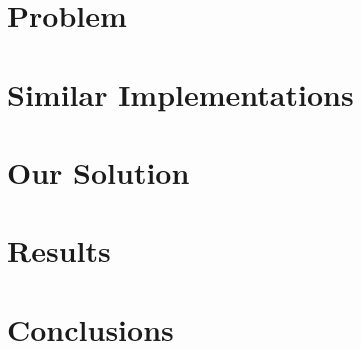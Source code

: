\documentclass[sigconf,12pt,review=false,natbib=false]{acmart}
\begin{document}
\section{Problem}

\section{Similar Implementations}

\section{Our Solution}

\section{Results}

\section{Conclusions}

\nocite{*}
\printbibliography
\end{document}
